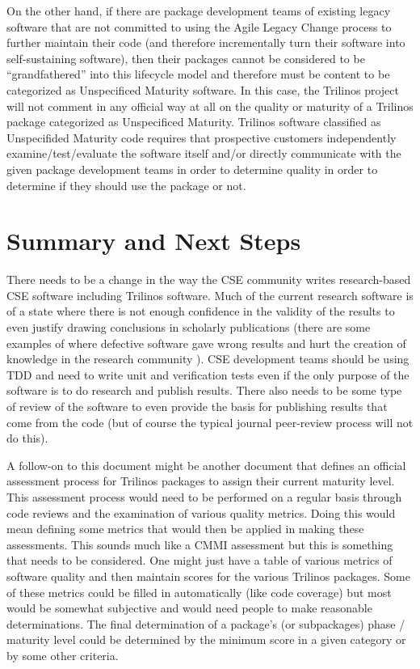 \documentclass[11pt]{SANDreport}
\begin{document}
On the other hand, if there are package development teams of existing
legacy software that are not committed to using the Agile Legacy
Change process to further maintain their code (and therefore
incrementally turn their software into self-sustaining software), then
their packages cannot be considered to be ``grandfathered'' into this
lifecycle model and therefore must be content to be categorized as
Unspecificed Maturity software.  In this case, the Trilinos project
will not comment in any official way at all on the quality or maturity
of a Trilinos package categorized as Unspecificed Maturity.  Trilinos
software classified as Unspecifided Maturity code requires that
prospective customers independently examine/test/evaluate the software
itself and/or directly communicate with the given package development
teams in order to determine quality in order to determine if they
should use the package or not.


%
{}\section{Summary and Next Steps}
\label{sec:summary_next_steps}
%

There needs to be a change in the way the CSE community writes
research-based CSE software including Trilinos software.  Much of the
current research software is of a state where there is not enough
confidence in the validity of the results to even justify drawing
conclusions in scholarly publications (there are some examples of
where defective software gave wrong results and hurt the creation of
knowledge in the research community
{}\cite{ScientistsNightmareFiveRetractions2006}).  CSE development
teams should be using TDD and need to write unit and verification
tests even if the only purpose of the software is to do research and
publish results.  There also needs to be some type of review of the
software to even provide the basis for publishing results that come
from the code (but of course the typical journal peer-review process
will not do this).

A follow-on to this document might be another document that defines an
official assessment process for Trilinos packages to assign their
current maturity level.  This assessment process would need to be
performed on a regular basis through code reviews and the examination
of various quality metrics.  Doing this would mean defining some
metrics that would then be applied in making these assessments. This
sounds much like a CMMI assessment but this is something that needs to
be considered.  One might just have a table of various metrics of
software quality and then maintain scores for the various Trilinos
packages.  Some of these metrics could be filled in automatically
(like code coverage) but most would be somewhat subjective and would
need people to make reasonable determinations.  The final
determination of a package's (or subpackages) phase / maturity level
could be determined by the minimum score in a given category or by
some other criteria.
\end{document}
